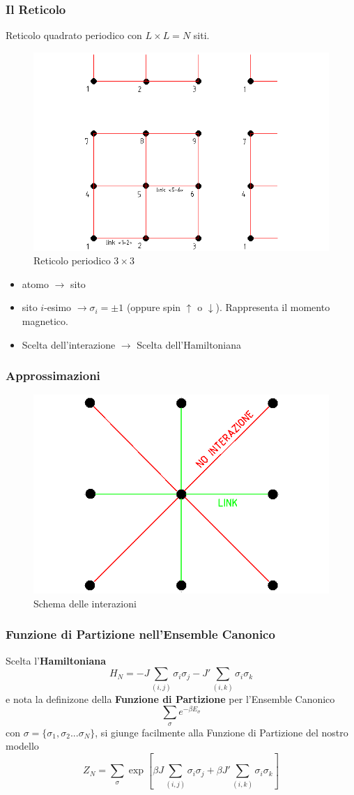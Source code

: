 \documentclass[11pt]{beamer}
\begin{document}
\begin{frame}
 \frametitle{Il Reticolo}
Reticolo quadrato periodico con $L\times L=N$ siti.
\begin{figure}[r]
	\centering
	\includegraphics[width=0.55\columnwidth]{ret33}
	\caption{Reticolo periodico $3\times3$}
	\label{fig1}
	\end{figure}
	\begin{itemize}
	\item<1->{atomo $\to$ sito}
	\item<2->{sito $i$-esimo $\to \sigma_i=\pm1$ (oppure spin $\uparrow$ o $\downarrow$). Rappresenta il momento magnetico.}
	\item<3->{Scelta dell'interazione $\to$ Scelta dell'Hamiltoniana}
	\end{itemize}
\end{frame}
 
  \begin{frame}
 \frametitle{Approssimazioni}
 \begin{figure}[r]
	\centering
	\includegraphics[width=0.7\columnwidth]{appr}
	\caption{Schema delle interazioni}
	\label{fig1}
	\end{figure}
\end{frame}
 
 \begin{frame}
 \frametitle{Funzione di Partizione nell'Ensemble Canonico}
Scelta l'\textbf{Hamiltoniana} 
 $$H_N=-J\sum_{(i,j)}\sigma_i\sigma_j-J'\sum_{(i,k)}\sigma_i\sigma_k
 $$
 e nota la definizone della \textbf{Funzione di Partizione} per l'Ensemble Canonico 
 $$\sum_\sigma e^{-\beta E_\sigma}
 $$
 con $\sigma= \{ \sigma_1,\sigma_2...\sigma_N \} $, si giunge facilmente alla Funzione di Partizione del nostro modello
 $$
 Z_N=\sum_\sigma \exp[\beta J\sum_{(i,j)}\sigma_i\sigma_j+\beta J'\sum_{(i,k)}\sigma_i\sigma_k]
 $$
\end{frame}
\end{document}
